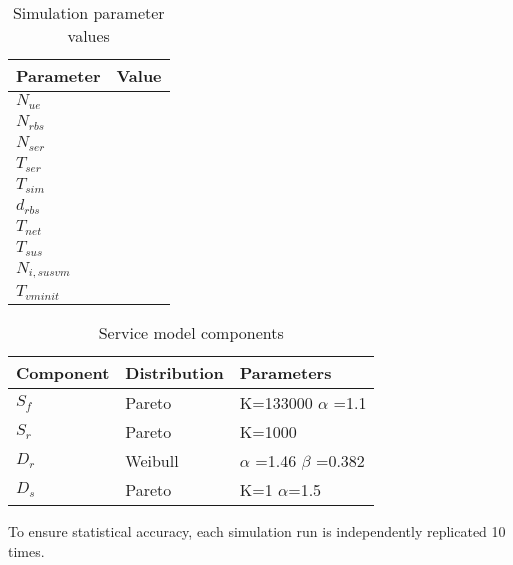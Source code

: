 \begin{table}[tb]
 	\centering
 	
    \begin{tabular}{|l|l|} \hline
    	\textbf{Parameter}    		& \textbf{Value} \\ \hline
    	$N_{ue}$   & \\ \hline
    	$N_{rbs}$  & \\ \hline
    	$N_{ser}$  & \\ \hline
    	$T_{ser}$  & \\ \hline
    	$T_{sim}$  & \\ \hline
    	$d_{rbs}$  & \\ \hline
    	$T_{net}$  & \\ \hline
        $T_{sus}$   & \\ \hline
        $N_{i,sus vm}$ & \\ \hline
        $T_{vm init}$ & \\ \hline
    \end{tabular}
    
    \caption{Simulation parameter values}
    \label{table:simulation_parameters}
\end{table}

\begin{table}[tb]
	\centering
	
    \begin{tabular}{|l|l|l|}\hline
    	\textbf{Component}  	& \textbf{Distribution} 	& \textbf{Parameters}     \\ \hline
    	$S_f$   & Pareto   				& K=133000 $\alpha$ =1.1  \\ \hline
    	$S_r$   & Pareto    				& K=1000         \\ \hline
    	$D_r$ 	& Weibull    				& $\alpha$ =1.46 $\beta$ =0.382 \\ \hline
    	$D_s$ 	& Pareto     				& K=1 $\alpha$=1.5      \\ \hline
    \end{tabular}
    
    \caption{Service model components}
    \label{table:traffic_parameters}
\end{table}

To ensure statistical accuracy, each simulation run is independently replicated 10 times.